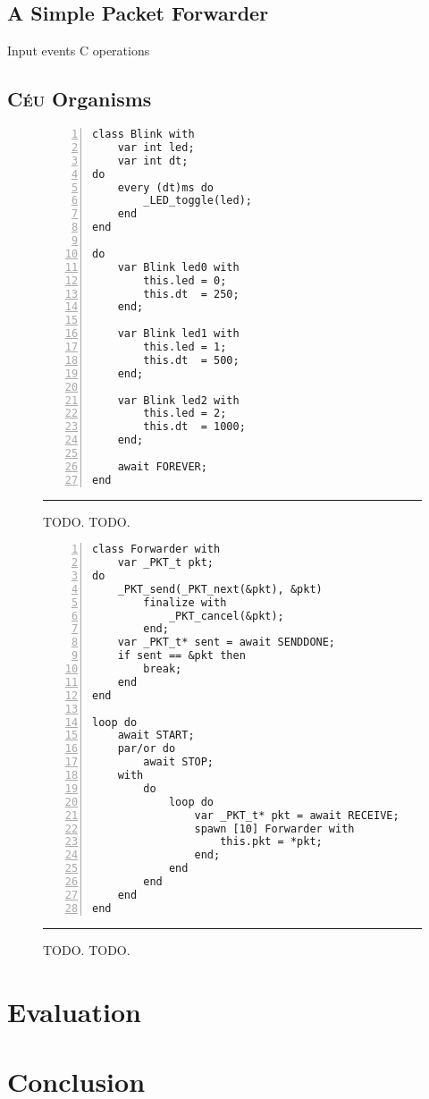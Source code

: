 \documentclass{llncs}
\newcommand{\CEU}{\textsc{C\'{e}u}\xspace}
\begin{document}
\subsection{A Simple Packet Forwarder}

Input events
C operations

\subsection{\CEU Organisms}

\begin{figure}[h]
\begin{lstlisting}[numbers=left,xleftmargin=2em]
class Blink with
    var int led;
    var int dt;
do
    every (dt)ms do
        _LED_toggle(led);
    end
end

do
    var Blink led0 with
        this.led = 0;
        this.dt  = 250;
    end;

    var Blink led1 with
        this.led = 1;
        this.dt  = 500;
    end;

    var Blink led2 with
        this.led = 2;
        this.dt  = 1000;
    end;

    await FOREVER;
end
\end{lstlisting}
\rule{12.2cm}{0.37pt}
\caption{ TODO.\newline
{\small %
TODO.
}%
\label{lst.TODO}
}
\end{figure}

\begin{figure}[h]
\begin{lstlisting}[numbers=left,xleftmargin=2em]
class Forwarder with
    var _PKT_t pkt;
do
    _PKT_send(_PKT_next(&pkt), &pkt)
        finalize with
            _PKT_cancel(&pkt);
        end;
    var _PKT_t* sent = await SENDDONE;
    if sent == &pkt then
        break;
    end
end

loop do
    await START;
    par/or do
        await STOP;
    with
        do
            loop do
                var _PKT_t* pkt = await RECEIVE;
                spawn [10] Forwarder with
                    this.pkt = *pkt;
                end;
            end
        end
    end
end
\end{lstlisting}
\rule{12.2cm}{0.37pt}
\caption{ TODO.\newline
{\small %
TODO.
}%
\label{lst.TODO}
}
\end{figure}

\section{Evaluation}

\section{Conclusion}



\end{document}
